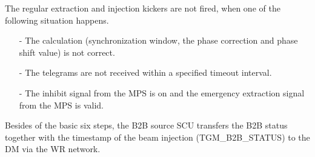 \begin{enumerate}
The regular extraction and injection kickers are not fired, when one of the following situation happens. 
\begin{itemize}
\item[-] The calculation (synchronization window, the phase correction and phase shift value) is not correct. 

\item[-] The telegrams are not received within a specified timeout interval. 

\item[-] The inhibit signal from the MPS is on and the emergency extraction signal from the MPS is valid. 
\end{itemize}
Besides of the basic six steps, the B2B source SCU transfers the B2B status together with the timestamp of the beam injection (TGM\_B2B\_STATUS) to the DM via the WR network. 
\end{enumerate}


